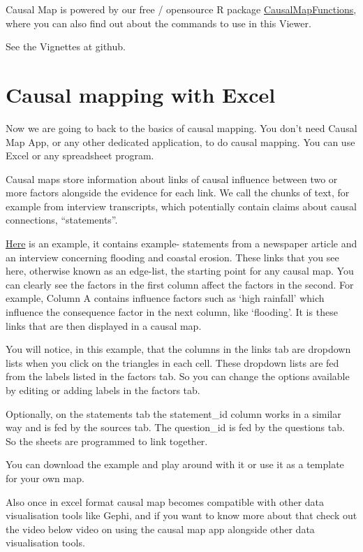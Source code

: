 \documentclass[
]{book}
\begin{document}
Causal Map is powered by our free / opensource R package \href{https://stevepowell99.github.io/CausalMapFunctions/}{CausalMapFunctions}, where you can also find out about the commands to use in this Viewer.

See the Vignettes at github.

\hypertarget{xexcel}{%
\chapter{Causal mapping with Excel}\label{xexcel}}

Now we are going to back to the basics of causal mapping. You don't need Causal Map App, or any other dedicated application, to do causal mapping. You can use Excel or any spreadsheet program.

Causal maps store information about links of causal influence between two or more factors alongside the evidence for each link. We call the chunks of text, for example from interview transcripts, which potentially contain claims about causal connections, ``statements''.

\href{https://docs.google.com/spreadsheets/d/12eXQDJtvlLO6qRrwbxwvkchfdTNLSbjo/edit?usp=sharing\&ouid=112812082380437768869\&rtpof=true\&sd=true}{Here} is an example, it contains example- statements from a newspaper article and an interview concerning flooding and coastal erosion. These links that you see here, otherwise known as an edge-list, the starting point for any causal map. You can clearly see the factors in the first column affect the factors in the second. For example, Column A contains influence factors such as `high rainfall' which influence the consequence factor in the next column, like `flooding'. It is these links that are then displayed in a causal map.

You will notice, in this example, that the columns in the links tab are dropdown lists when you click on the triangles in each cell. These dropdown lists are fed from the labels listed in the factors tab. So you can change the options available by editing or adding labels in the factors tab.

Optionally, on the statements tab the statement\_id column works in a similar way and is fed by the sources tab. The question\_id is fed by the questions tab. So the sheets are programmed to link together.

You can download the example and play around with it or use it as a template for your own map.

Also once in excel format causal map becomes compatible with other data visualisation tools like Gephi, and if you want to know more about that check out the video below video on using the causal map app alongside other data visualisation tools.
\end{document}

